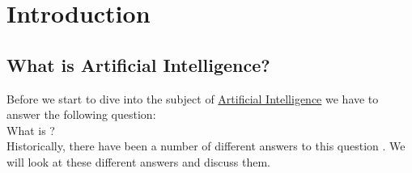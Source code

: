 \chapter{Introduction}

\section{What is Artificial Intelligence?}
Before we start to dive into the subject of
\href{https://en.wikipedia.org/wiki/Artificial_intelligence}{Artificial Intelligence} we have to answer the
following question:  
\\[0.2cm]
\hspace*{1.3cm}
What is ? 
\\[0.2cm] 
Historically, there have been a number of different answers to this question \cite{russell:2009}.  We will look at these
different answers and discuss them.
